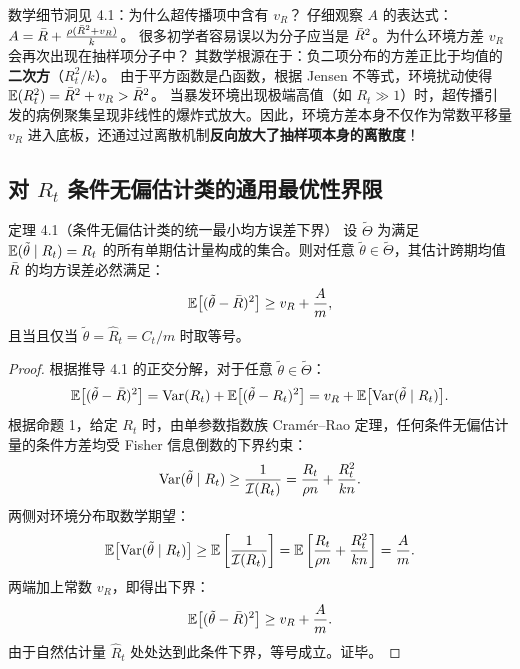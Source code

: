 \begin{insightbox}{数学细节洞见 4.1：为什么超传播项中含有 $v_R$？}
仔细观察 $A$ 的表达式：$A = \bar{R} + \frac{\rho(\bar{R}^2 + v_R)}{k}$。
很多初学者容易误以为分子应当是 $\bar{R}^2$。为什么环境方差 $v_R$ 会再次出现在抽样项分子中？
其数学根源在于：负二项分布的方差正比于均值的\textbf{二次方}（$R_t^2/k$）。
由于平方函数是凸函数，根据 Jensen 不等式，环境扰动使得 $\mathbb{E}(R_t^2) = \bar{R}^2 + v_R > \bar{R}^2$。
当暴发环境出现极端高值（如 $R_t \gg 1$）时，超传播引发的病例聚集呈现非线性的爆炸式放大。因此，环境方差本身不仅作为常数平移量 $v_R$ 进入底板，还通过过离散机制\textbf{反向放大了抽样项本身的离散度}！
\end{insightbox}

\subsection{对 $R_t$ 条件无偏估计类的通用最优性界限}

\begin{theorembox}{定理 4.1（条件无偏估计类的统一最小均方误差下界）}
设 $\widetilde{\Theta}$ 为满足 $\mathbb{E}(\tilde{\theta} \mid R_t) = R_t$ 的所有单期估计量构成的集合。则对任意 $\tilde{\theta} \in \widetilde{\Theta}$，其估计跨期均值 $\bar{R}$ 的均方误差必然满足：
\begin{equation}
  \mathbb{E}\big[(\tilde{\theta} - \bar{R})^2\big] \ge v_R + \frac{A}{m},
\end{equation}
且当且仅当 $\tilde{\theta} = \widehat{R}_t = C_t/m$ 时取等号。
\end{theorembox}

\begin{proof}
根据推导 4.1 的正交分解，对于任意 $\tilde{\theta} \in \widetilde{\Theta}$：
\begin{equation}
  \mathbb{E}\big[(\tilde{\theta} - \bar{R})^2\big] = \mathrm{Var}(R_t) + \mathbb{E}\big[(\tilde{\theta} - R_t)^2\big] = v_R + \mathbb{E}\big[ \mathrm{Var}(\tilde{\theta} \mid R_t) \big].
\end{equation}
根据命题 1，给定 $R_t$ 时，由单参数指数族 Cramér--Rao 定理，任何条件无偏估计量的条件方差均受 Fisher 信息倒数的下界约束：
\begin{equation}
  \mathrm{Var}(\tilde{\theta} \mid R_t) \ge \frac{1}{\mathcal{I}(R_t)} = \frac{R_t}{\rho n} + \frac{R_t^2}{kn}.
\end{equation}
两侧对环境分布取数学期望：
\begin{equation}
  \mathbb{E}\big[ \mathrm{Var}(\tilde{\theta} \mid R_t) \big] \ge \mathbb{E}\left[ \frac{1}{\mathcal{I}(R_t)} \right] = \mathbb{E}\left[ \frac{R_t}{\rho n} + \frac{R_t^2}{kn} \right] = \frac{A}{m}.
\end{equation}
两端加上常数 $v_R$，即得出下界：
\begin{equation}
  \mathbb{E}\big[(\tilde{\theta} - \bar{R})^2\big] \ge v_R + \frac{A}{m}.
\end{equation}
由于自然估计量 $\widehat{R}_t$ 处处达到此条件下界，等号成立。证毕。
\end{proof}

